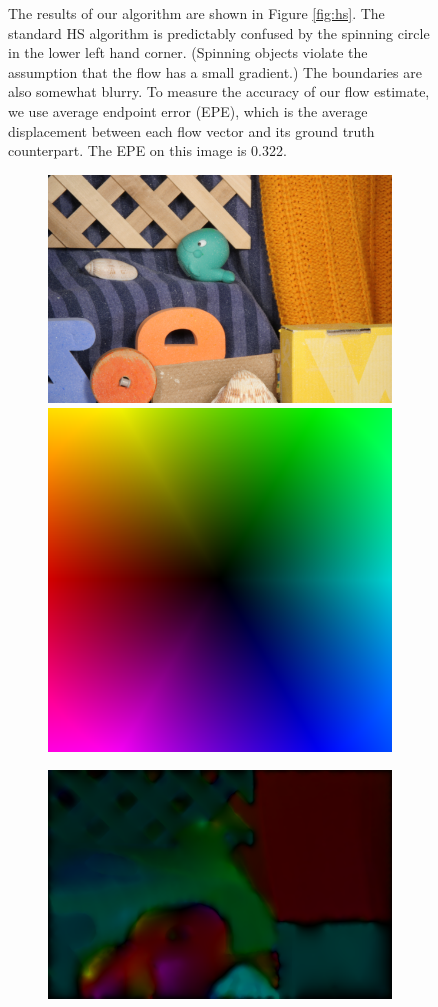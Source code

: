 \documentclass[10pt,twocolumn,letterpaper]{article}
\begin{document}
\begin{figure}

The results of our algorithm are shown in Figure \ref{fig:hs}.  The standard HS algorithm is predictably confused by the spinning circle in the lower left hand corner.  (Spinning objects violate the assumption that the flow has a small gradient.)  The boundaries are also somewhat blurry.  To measure the accuracy of our flow estimate, we use average endpoint error (EPE), which is the average displacement between each flow vector and its ground truth counterpart.  The EPE on this image is 0.322.

\begin{figure}

\includegraphics[width=0.6 \columnwidth] {frame10.png} 
\includegraphics[width=0.39 \columnwidth] {flow-color-key.png}

\includegraphics[width=\columnwidth]{10iter.png}


\end{figure}
\end{figure}
\end{document}

